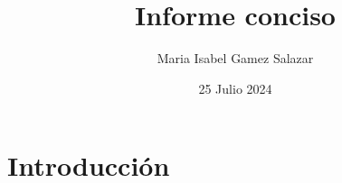 \documentclass{article}
\title{Informe conciso}
\author {Maria Isabel Gamez Salazar}
\date {25 Julio 2024}
\begin{document}

\maketitle
\section {Introducción}
\end{document}
